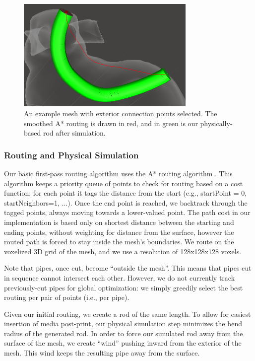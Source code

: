 \begin{figure}[h!]
\centering
    \includegraphics[width=3.4in]{figures/exterior.png}
\caption{An example mesh with exterior connection points selected.  The smoothed A* routing is drawn in {\color{red}red}, and in {\color{tovi}green} is our physically-based rod after simulation.}
\label{fig:tool-process-exterior}
\end{figure}

\subsubsection{Routing and Physical Simulation}

Our basic first-pass routing algorithm uses the A* routing algorithm \cite{Hart-Astar}.  This algorithm keeps a priority queue of points to check for routing based on a cost function; for each point it tags the distance from the start (e.g., startPoint = 0, startNeighbors=1, ...).  Once the end point is reached, we backtrack through the tagged points, always moving towards a lower-valued point.  The path cost in our implementation is based only on shortest distance between the starting and ending points, without weighting for distance from the surface, however the routed path is forced to stay inside the mesh's boundaries.  We route on the voxelized 3D grid of the mesh, and we use a resolution of 128x128x128 voxels. 

Note that pipes, once cut, become ``outside the mesh''.  This means that pipes cut in sequence cannot intersect each other.  However, we do not currently track previously-cut pipes for global optimization: we simply greedily select the best routing per pair of points (i.e., per pipe).

Given our initial routing, we create a rod of the same length.  To allow for easiest insertion of media post-print, our physical simulation step minimizes the bend radius of the generated rod.  In order to force our simulated rod away from the surface of the mesh, we create ``wind'' pushing inward from the exterior of the mesh.  This wind keeps the resulting pipe away from the surface. 

